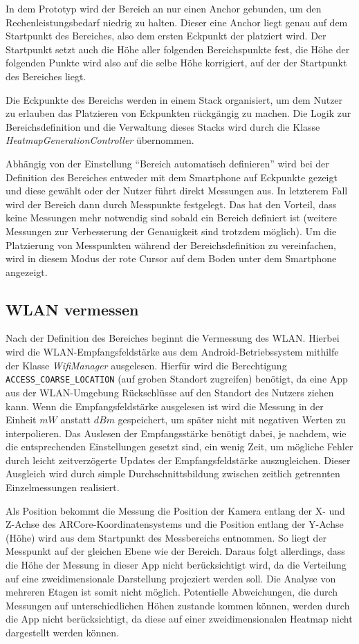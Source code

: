 \documentclass[10pt]{scrartcl}
\newcommand{\inlcode}{\texttt}
\begin{document}
In dem Prototyp wird der Bereich an nur einen Anchor gebunden, um den Rechenleistungsbedarf niedrig zu halten. Dieser eine Anchor liegt genau auf dem Startpunkt des Bereiches, also dem ersten Eckpunkt der platziert wird. Der Startpunkt setzt auch die Höhe aller folgenden Bereichspunkte fest, die Höhe der folgenden Punkte wird also auf die selbe Höhe korrigiert, auf der der Startpunkt des Bereiches liegt.

Die Eckpunkte des Bereichs werden in einem Stack organisiert, um dem Nutzer zu erlauben das Platzieren von Eckpunkten rückgängig zu machen. Die Logik zur Bereichsdefinition und die Verwaltung dieses Stacks wird durch die Klasse \textit{HeatmapGenerationController} übernommen.

Abhängig von der Einstellung \enquote{Bereich automatisch definieren} wird bei der Definition des Bereiches entweder mit dem Smartphone auf Eckpunkte gezeigt und diese gewählt oder der Nutzer führt direkt Messungen aus. In letzterem Fall wird der Bereich dann durch Messpunkte festgelegt. Das hat den Vorteil, dass keine Messungen mehr notwendig sind sobald ein Bereich definiert ist (weitere Messungen zur Verbesserung der Genauigkeit sind trotzdem möglich). Um die Platzierung von Messpunkten während der Bereichsdefinition zu vereinfachen, wird in diesem Modus der rote Cursor auf dem Boden unter dem Smartphone angezeigt.

\subsection{WLAN vermessen}
Nach der Definition des Bereiches beginnt die Vermessung des WLAN. Hierbei wird die WLAN-Empfangsfeldstärke aus dem Android-Betriebssystem mithilfe der Klasse \textit{WifiManager} ausgelesen. Hierfür wird die Berechtigung \inlcode{ACCESS\_COARSE\_LOCATION} (auf groben Standort zugreifen) benötigt, da eine App aus der WLAN-Umgebung Rückschlüsse auf den Standort des Nutzers ziehen kann. Wenn die Empfangsfeldstärke ausgelesen ist wird die Messung in der Einheit $mW$ anstatt $dBm$ gespeichert, um später nicht mit negativen Werten zu interpolieren. Das Auslesen der Empfangsstärke benötigt dabei, je nachdem, wie die entsprechenden Einstellungen gesetzt sind, ein wenig Zeit, um mögliche Fehler durch leicht zeitverzögerte Updates der Empfangsfeldstärke auszugleichen. Dieser Ausgleich wird durch simple Durchschnittsbildung zwischen zeitlich getrennten Einzelmessungen realisiert.

Als Position bekommt die Messung die Position der Kamera entlang der X- und Z-Achse des ARCore-Koordinatensystems und die Position entlang der Y-Achse (Höhe) wird aus dem Startpunkt des Messbereichs entnommen. So liegt der Messpunkt auf der gleichen Ebene wie der Bereich. Daraus folgt allerdings, dass die Höhe der Messung in dieser App nicht berücksichtigt wird, da die Verteilung auf eine zweidimensionale Darstellung projeziert werden soll. Die Analyse von mehreren Etagen ist somit nicht möglich. Potentielle Abweichungen, die durch Messungen auf unterschiedlichen Höhen zustande kommen können, werden durch die App nicht berücksichtigt, da diese auf einer zweidimensionalen Heatmap nicht dargestellt werden können.
\end{document}
